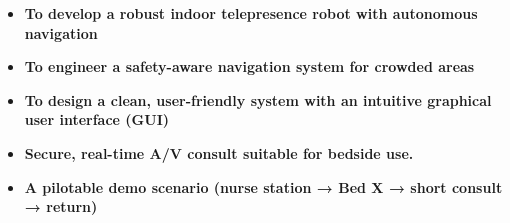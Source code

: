 \documentclass[11pt,a4paper]{article}
\begin{document}
\begin{itemize}[leftmargin=*]
    \item \textbf{To develop a robust indoor telepresence robot with autonomous navigation} %

    \item \textbf{To engineer a safety-aware navigation system for crowded areas} %

    \item \textbf{To design a clean, user-friendly system with an intuitive graphical user interface (GUI)} %

    \item \textbf{Secure, real-time A/V consult suitable for bedside use. }

    \item \textbf{A pilotable demo scenario (nurse station → Bed X → short consult → return) } %
\end{itemize}
\end{document}
